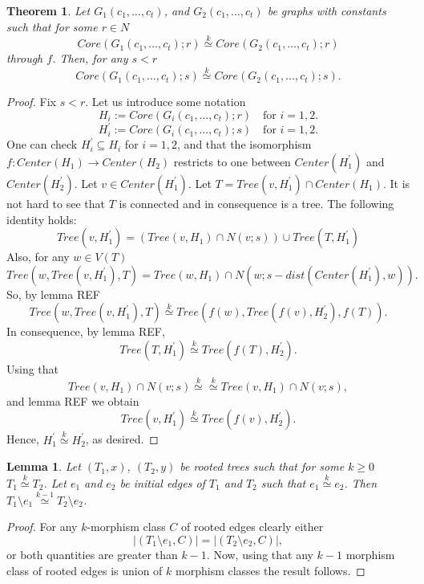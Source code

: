 \documentclass[11pt,notitlepage]{report}
\newtheorem{theorem}{Theorem}[chapter]
\newtheorem{lemma}{Lemma}[chapter]
\theoremstyle{definition}
\newcommand{\morph}[1]{\stackrel{#1}{\simeq}}
\begin{document}
\begin{theorem}
	Let $G_1(c_1,\dots, c_t)$, and $G_2(c_1,\dots,c_t)$ be graphs
	with constants such that for some $r\in N$
	\[ Core(G_1(c_1,\dots, c_t);r)\morph{k} Core(G_2(c_1,\dots,c_t);r)\]
	through $f$. 
	Then, for any $s<r$
	\[ Core(G_1(c_1,\dots, c_t);s)\morph{k} Core(G_2(c_1,\dots,c_t);s).\]
\end{theorem}
\begin{proof}
	Fix $s<r$. Let us introduce some notation
	\[ H_i:= Core(G_i(c_1,\dots, c_t);r) \quad \text{for }i=1,2.\]
	\[ H^\prime_i:= Core(G_i(c_1,\dots, c_t);s) \quad \text{for }i=1,2.\]
	One can check $H^\prime_i\subseteq H_i$ for $i=1,2$, and that the isomorphism 
	$f:Center(H_1)\rightarrow Center(H_2)$ restricts to one between
	$Center(H^\prime_1)$ and $Center(H^\prime_2)$. Let $v\in Center(H^\prime_1)$.
	Let $T=Tree(v,H^\prime_1)\cap Center(H_1)$. It is not hard to see that $T$ is connected 
	and in consequence is a tree. The following identity holds:
	\[ Tree(v,H^\prime_1)= (Tree(v,H_1)\cap N(v;s)) \cup Tree(T,H^\prime_1) \]
	Also, for any $w\in V(T)$
	\[Tree(w,Tree(v,H^\prime_1),T) = Tree(w,H_1)\cap N(w; s-dist(Center(H^\prime_1),w)).\]
	So, by lemma REF 
	\[Tree(w,Tree(v,H^\prime_1),T)\morph{k}Tree(f(w),Tree(f(v),H^\prime_2),f(T)).\]
	In consequence, by lemma REF,
	\[Tree(T,H^\prime_1)\morph{k} Tree(f(T),H^\prime_2).\]
	Using that 
	\[Tree(v,H_1)\cap N(v;s)\morph{k} \morph{k} Tree(v,H_1)\cap N(v;s),\]
	and lemma REF we obtain
	\[Tree(v,H^\prime_1)\morph{k} Tree(f(v),H^\prime_2) .\]
	Hence, $H^\prime_1\morph{k} H^\prime_2$, as desired. 
\end{proof}

\begin{lemma}
	Let $(T_1,x)$, $(T_2, y)$ be rooted trees such that for some $k\geq 0$
	$T_1\morph{k} T_2$. Let $e_1$ and $e_2$ be initial edges of $T_1$ and $T_2$
	such that $e_1\morph{k} e_2$. Then $T_1\setminus e_1\morph{k-1} T_2\setminus e_2$.
\end{lemma}

\begin{proof}
	For any $k$-morphism class $C$ of rooted edges clearly either
	\[|(T_1\setminus e_1,C)|=|(T_2\setminus e_2,C)|,\]
	or both quantities are greater than $k-1$.
	Now, using that any $k-1$ morphism class of rooted edges is union of
	$k$ morphism classes the result follows. 	
\end{proof}
\end{document}
